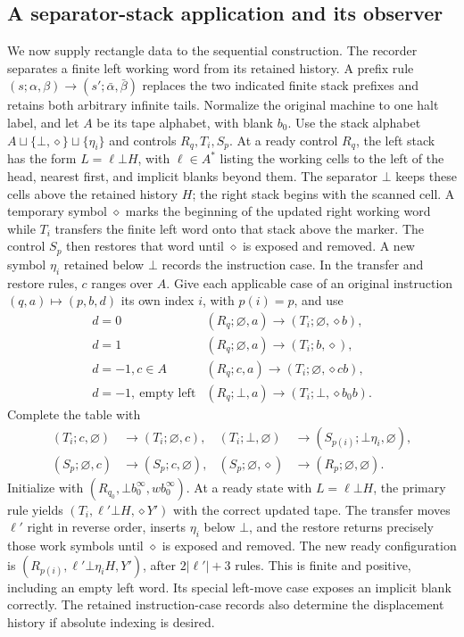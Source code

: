 \subsection{A separator-stack application and its observer}
\label{sv:separator}
We now supply rectangle data to the sequential construction.  The
recorder separates a finite left working word from its retained history.
A prefix rule $(s;\alpha,\beta)\to(s';\bar\alpha,\bar\beta)$
replaces the two indicated finite stack prefixes and retains both
arbitrary infinite tails.  Normalize the original machine to one halt label,
and let $A$ be its tape alphabet, with blank $b_0$. Use the stack
alphabet $A\sqcup\{\bot,\diamond\}\sqcup\{\eta_i\}$ and controls
$R_q,T_i,S_p$. At a ready control $R_q$, the left stack has the form
$L=\ell\bot H$, with $\ell\in A^*$ listing the working cells to
the left of the head, nearest first, and implicit blanks beyond them.
The separator $\bot$ keeps these cells above the retained history $H$;
the right stack begins with the scanned cell. A temporary symbol
$\diamond$ marks the beginning of the updated right working word while
$T_i$ transfers the finite left word onto that stack above the marker.
The control $S_p$ then
restores that word until $\diamond$ is exposed and removed. A new symbol
$\eta_i$ retained below $\bot$ records the instruction case.
In the transfer and restore rules, $c$ ranges over $A$.
Give each applicable case of an original instruction
$(q,a)\mapsto(p,b,d)$ its own index $i$, with $p(i)=p$, and use
\begin{equation}\label{sv:separator-primary}
\begin{array}{c|l}
d=0 &(R_q;\varnothing,a)\to(T_i;\varnothing,\diamond b),\\
d=1 &(R_q;\varnothing,a)\to(T_i;b,\diamond),\\
d=-1, c\in A &(R_q;c,a)\to(T_i;\varnothing,\diamond cb),\\
d=-1,\ \text{empty left}&(R_q;\bot,a)\to(T_i;\bot,\diamond b_0b).
\end{array}
\end{equation}
Complete the table with
\begin{equation}\label{sv:separator-transfer}
\begin{aligned}
(T_i;c,\varnothing)&\to(T_i;\varnothing,c),&
(T_i;\bot,\varnothing)&\to(S_{p(i)};\bot\eta_i,\varnothing),\\
(S_p;\varnothing,c)&\to(S_p;c,\varnothing),&
(S_p;\varnothing,\diamond)&\to(R_p;\varnothing,\varnothing).
\end{aligned}
\end{equation}
Initialize with $(R_{q_0},\bot b_0^\infty,wb_0^\infty)$.
At a ready state with $L=\ell\bot H$, the primary rule yields
$(T_i,\ell'\bot H,\diamond Y')$ with
the correct updated tape.  The transfer moves $\ell'$ right in
reverse order, inserts $\eta_i$ below $\bot$, and the restore
returns precisely those work symbols until $\diamond$ is exposed
and removed.  The new ready configuration is
$(R_{p(i)},\ell'\bot\eta_iH,Y')$, after
$2|\ell'|+3$ rules.  This is finite and positive, including an empty
left word.  Its special left-move case exposes an implicit blank correctly.
The retained instruction-case records also determine the displacement
history if absolute indexing is desired.

